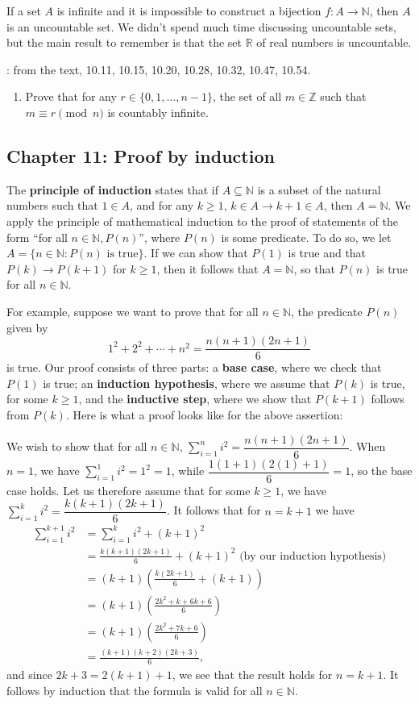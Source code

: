 \documentclass[letterpaper,12pt]{article}
\newcommand{\N}{\mathbb{N}}
\newcommand{\Z}{\mathbb{Z}}
\newcommand{\R}{\mathbb{R}}
\begin{document}
If a set $A$ is infinite and it is impossible to construct a bijection $f:A\to \N$, then $A$ is an uncountable set. We didn't spend much time discussing uncountable sets, but the main result to remember is that the set $\R$ of real numbers is uncountable.

: from the text, 10.11, 10.15, 10.20, 10.28, 10.32, 10.47, 10.54.
\begin{enumerate}
 \item Prove that for any $r\in \{0,1,\ldots, n-1\}$, the set of all $m\in\Z$ such that $m\equiv r\pmod{n}$ is countably infinite.
\end{enumerate}
\subsection*{Chapter 11: Proof by induction}
The {\bf principle of induction} states that if $A\subseteq \N$ is a subset of the natural numbers such that $1\in A$, and for any $k\geq 1$, $k\in A\to k+1\in A$, then $A=\N$. We apply the principle of mathematical induction to the proof of statements of the form ``for all $n\in \N, P(n)$'', where $P(n)$ is some predicate. To do so, we let $A = \{n\in \N : P(n) \text{ is true}\}$. If we can show that $P(1)$ is true and that $P(k)\to P(k+1)$ for $k\geq 1$, then it follows that $A=\N$, so that $P(n)$ is true for all $n\in\N$.

For example, suppose we want to prove that for all $n\in \N$, the predicate $P(n)$ given by
\[
 1^2+2^2+\cdots + n^2 = \frac{n(n+1)(2n+1)}{6}
\]
is true. Our proof consists of three parts: a {\bf base case}, where we check that $P(1)$ is true; an {\bf induction hypothesis}, where we assume that $P(k)$ is true, for some $k\geq 1$, and the {\bf inductive step}, where we show that $P(k+1)$ follows from $P(k)$. Here is  what a proof looks like for the above assertion:

We wish to show that for all $n\in \N$, $\sum_{i=1}^n i^2 = \dfrac{n(n+1)(2n+1)}{6}$. When $n=1$, we have $\sum_{i=1}^1 i^2 = 1^2 = 1$, while $\dfrac{1(1+1)(2(1)+1)}{6} = 1$, so the base case holds. Let us therefore assume that for some $k\geq 1$, we have $\sum_{i=1}^k i^2 = \dfrac{k(k+1)(2k+1)}{6}$. It follows that for $n=k+1$ we have
\begin{align*}
 \sum_{i=1}^{k+1} i^2 & = \sum_{i=1}^k i^2 + (k+1)^2\\
& = \frac{k(k+1)(2k+1)}{6} + (k+1)^2 \text{ (by our induction hypothesis)}\\
& = (k+1)\left(\frac{k(2k+1)}{6} + (k+1)\right)\\
& = (k+1)\left(\frac{2k^2+k+6k+6}{6}\right)\\
& = (k+1)\left(\frac{2k^2+7k+6}{6}\right)\\
& = \frac{(k+1)(k+2)(2k+3)}{6},
\end{align*}
and since $2k+3 = 2(k+1)+1$, we see that the result holds for $n=k+1$. It follows by induction that the formula is valid for all $n\in\N$.
\end{document}
